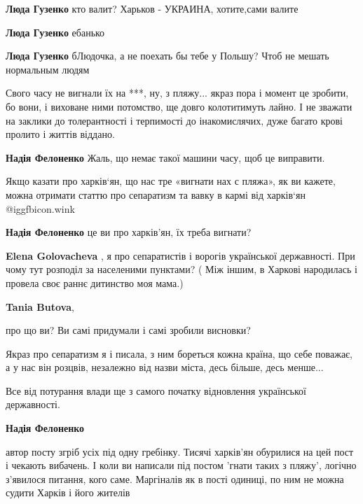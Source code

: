 \begin{itemize}
\begin{itemize}
\textbf{Люда Гузенко} кто валит? Харьков - УКРАИНА, хотите,сами валите

\textbf{Люда Гузенко} ебанько

\textbf{Люда Гузенко} бЛюдочка, а не поехать бы тебе у Польшу?
Чтоб не мешать нормальным людям

\end{itemize} %


Свого часу не вигнали їх на ***, ну, з пляжу... якраз пора і момент це зробити,
бо вони, і виховане ними потомство, ще довго колотитимуть лайно. І не зважати
на заклики до толерантності і терпимості до інакомислячих, дуже багато крові
пролито і життів віддано.

\begin{itemize} %
\textbf{Надія Фелоненко} Жаль, що немає такої машини часу, щоб це виправити.


Якщо казати про харків‘ян, що нас тре «вигнати нах с пляжа», як ви кажете,
можна отримати статтю про сепаратизм та вавку в кармі від харків‘ян  @igg{fbicon.wink} 

\textbf{Надія Фелоненко} це ви про харків'ян, їх треба вигнати?

\textbf{Elena Golovacheva} , я про сепаратистів і ворогів української державності.
При чому тут розподіл за населеними пунктами? ( Між іншим, в Харкові народилась і провела своє раннє дитинство моя мама.)

\textbf{Tania Butova}, 

про що ви? Ви самі придумали і самі зробили висновки?

Якраз про сепаратизм я і писала, з ним бореться кожна країна, що себе поважає,
а у нас він розцвів, незалежно від назви міста, десь більше, десь менше...

Все від потурання влади ще з самого початку відновлення української
державності.

\textbf{Надія Фелоненко} 

автор посту згріб усіх під одну гребінку. Тисячі харків'ян обурилися на цей
пост і чекають вибачень. І коли ви написали під постом 'гнати таких з пляжу',
логічно з'явилося питання, кого саме. Маргіналів як в пості одиниці, по ним не
можна судити Харків і його жителів


\end{itemize}
\end{itemize}
